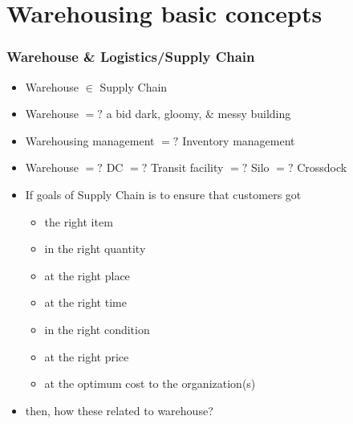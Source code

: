 \documentclass[10pt,handout,notes=show]{beamer}
\begin{document}
\section[Warehouse 101]{Warehousing basic concepts}
\begin{frame}
  \frametitle{Warehouse \& Logistics/Supply Chain}

    \begin{itemize}
      \item Warehouse $\in$ Supply Chain
      \item Warehouse $=\!\!\!?$ a bid dark, gloomy, \& messy building
      \item Warehousing management $=\!\!\!?$ Inventory management
      \item Warehouse $=\!\!\!?$ DC $=\!\!\!?$ Transit facility $=\!\!\!?$ Silo $=\!\!\!?$ Crossdock
      \item If goals of Supply Chain is to ensure that \alert{customers} got
      \begin{itemize}
      \item[] the right \alert{item}
      \item[] in the right \alert{quantity}
      \item[] at the right \alert{place}
      \item[] at the right \alert{time}
      \item[] in the right \alert{condition}
      \item[] at the right \alert{price}
      \item[] at the optimum cost to the \alert{organization(s)}
      \end{itemize}
      \item[] then, how these related to \alert{warehouse}?
    \end{itemize}


\end{frame}
\end{document}
